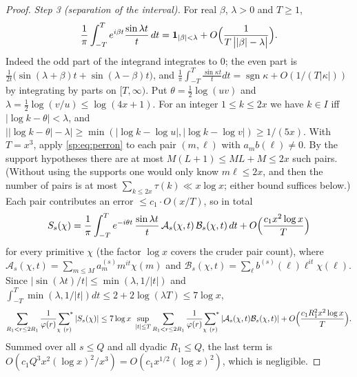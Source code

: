 \documentclass[final,11pt]{elsarticle}
\theoremstyle{definition}
\theoremstyle{remark}
\newcommand{\one}{\mathbf1}
\numberwithin{equation}{section}
\begin{document}
\begin{proof}
\emph{Step 3 (separation of the interval).} For real $\beta$, $\lambda>0$ and $T\ge1$,
\begin{equation}\label{sp:eq:perron}
 \frac1\pi\int_{-T}^{T}e^{i\beta t}\frac{\sin\lambda t}{t}\,dt
 =\one_{|\beta|<\lambda}+O\Bigl(\frac1{T\,\bigl||\beta|-\lambda\bigr|}\Bigr).
\end{equation}
Indeed the odd part of the integrand integrates to $0$; the even part is
$\frac{1}{2t}\bigl(\sin(\lambda+\beta)t+\sin(\lambda-\beta)t\bigr)$, and
$\frac1\pi\int_{-T}^T\frac{\sin\kappa t}{t}dt=\operatorname{sgn}\kappa+O(1/(T|\kappa|))$
by integrating by parts on $[T,\infty)$. Put $\theta=\frac12\log(uv)$ and
$\lambda=\frac12\log(v/u)\le\log(4x+1)$. For an integer $1\le k\le2x$ we have
$k\in I$ iff $|\log k-\theta|<\lambda$, and
$\bigl||\log k-\theta|-\lambda\bigr|\ge\min(|\log k-\log u|,|\log k-\log v|)\ge1/(5x)$.
With $T=x^3$, apply \eqref{sp:eq:perron} to each pair $(m,\ell)$ with
$a_mb(\ell)\ne0$. By the support hypotheses there are at most
$M(L+1)\le ML+M\le2x$ such pairs. (Without using the supports one would only
know $m\ell\le2x$, and then the number of pairs is at most
$\sum_{k\le2x}\tau(k)\ll x\log x$; either bound suffices below.) Each pair
contributes an error $\le c_1\cdot O(x/T)$, so in total
\[
 S_s(\chi)=\frac1\pi\int_{-T}^{T}e^{-i\theta t}\,\frac{\sin\lambda t}{t}\,
 \mathcal A_s(\chi,t)\,\mathcal B_s(\chi,t)\,dt+O\Bigl(\frac{c_1x^2\log x}{T}\Bigr)
\]
for every primitive $\chi$ (the factor $\log x$ covers the cruder pair count),
where $\mathcal A_s(\chi,t)=\sum_{m\le M}a^{(s)}_mm^{it}\chi(m)$ and
$\mathcal B_s(\chi,t)=\sum_{\ell}b^{(s)}(\ell)\ell^{it}\chi(\ell)$. Since
$|\sin(\lambda t)/t|\le\min(\lambda,1/|t|)$ and
$\int_{-T}^T\min(\lambda,1/|t|)dt\le2+2\log(\lambda T)\le7\log x$,
\begin{equation}\label{sp:eq:sep}
 \sum_{R_1<r\le2R_1}\frac{1}{\varphi(r)}\sideset{}{^*}\sum_{\chi\ (r)}|S_s(\chi)|
 \le 7\log x\ \sup_{|t|\le T}\sum_{R_1<r\le2R_1}\frac1{\varphi(r)}
 \sideset{}{^*}\sum_{\chi\ (r)}|\mathcal A_s(\chi,t)\mathcal B_s(\chi,t)|+O\Bigl(\frac{c_1R_1^2x^2\log x}{T}\Bigr).
\end{equation}
Summed over all $s\le Q$ and all dyadic $R_1\le Q$, the last term is
$O(c_1Q^3x^2(\log x)^2/x^3)=O(c_1x^{1/2}(\log x)^2)$, which is negligible.


\end{proof}
\end{document}
